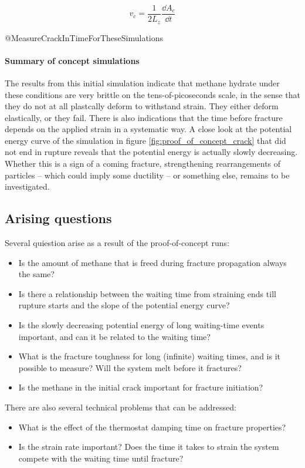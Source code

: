\begin{equation}
v_c = \frac{1}{2L_z}\frac{\dd A_c}{\dd t}
\end{equation}

@MeasureCrackInTimeForTheseSimulations

\paragraph{Summary of concept simulations} The results from this initial simulation indicate that methane hydrate under these conditions are very brittle on the tens-of-picoseconds scale, in the sense that they do not at all plastcally deform to withstand strain. They either deform elastically, or they fail. There is also indications that the time before fracture depends on the applied strain in a systematic way. A close look at the potential energy curve of the simulation in figure \ref{fig:proof_of_concept_crack} that did not end in rupture reveals that the potential energy is actually slowly decreasing. Whether this is a sign of a coming fracture, strengthening rearrangements of particles -- which could imply some ductility -- or something else, remains to be investigated. 

\subsection{Arising questions}
Several quiestion arise as a result of the proof-of-concept runs:
\begin{itemize}
\item Is the amount of methane that is freed during fracture propagation always the same?
\item Is there a relationship between the waiting time from straining ends till rupture starts and the slope of the potential energy curve?
\item Is the slowly decreasing potential energy of long waiting-time events important, and can it be related to the waiting time?
\item What is the fracture toughness for long (infinite) waiting times, and is it possible to measure? Will the system melt before it fractures?
\item Is the methane in the initial crack important for fracture initiation?
\end{itemize}

There are also several technical problems that can be addressed:
\begin{itemize}
\item What is the effect of the thermostat damping time on fracture properties?
\item Is the strain rate important? Does the time it takes to strain the system compete with the waiting time until fracture?
\end{itemize}

